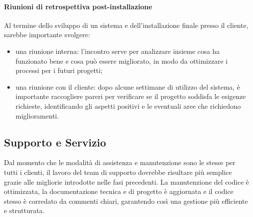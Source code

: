             \paragraph{Riunioni di retrospettiva post-installazione}
            Al termine dello sviluppo di un sistema e dell'installazione finale presso il cliente, sarebbe importante svolgere:
            \begin{itemize}
                \item una riunione interna: l'incontro serve per analizzare insieme cosa ha funzionato bene e cosa può essere migliorato,
                in modo da ottimizzare i processi per i futuri progetti;
                \item una riunione con il cliente: dopo alcune settimane di utilizzo del sistema, è importante raccogliere pareri
                per verificare se il progetto soddisfa le
                esigenze richieste, identificando gli aspetti positivi e le eventuali aree che richiedono miglioramenti.
            \end{itemize}           

    \subsection{Supporto e Servizio}
    Dal momento che le modalità di assistenza e manutenzione sono le stesse per tutti i clienti,
    il lavoro del team di supporto dovrebbe risultare più semplice grazie alle migliorie introdotte nelle fasi precedenti.
    La manutenzione del codice è ottimizzata, la documentazione tecnica e di progetto è aggiornata e il codice stesso
    è corredato da commenti chiari, garantendo così una gestione più efficiente e strutturata.
    